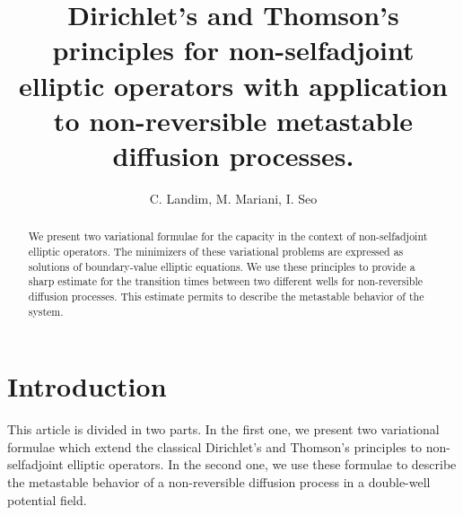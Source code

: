 \documentclass[reqno]{amsart}
\newcounter{as}[section]
\newcommand{\<}{\langle}
\renewcommand{\>}{\rangle}
\begin{document}
\title[Metastability in non-reversible diffusion processes] {
  Dirichlet's and Thomson's principles for non-selfadjoint elliptic
  operators with application to non-reversible metastable diffusion
  processes.}

\begin{abstract}
  We present two variational formulae for the capacity in the context
  of non-selfadjoint elliptic operators. The minimizers of these
  variational problems are expressed as solutions of boundary-value
  elliptic equations.  We use these principles to provide a sharp
  estimate for the transition times between two different wells for
  non-reversible diffusion processes.  This estimate permits to
  describe the metastable behavior of the system.
\end{abstract}

\author{C. Landim, M. Mariani, I. Seo}

\address{\noindent IMPA, Estrada Dona Castorina 110, CEP 22460 Rio de
  Janeiro, Brasil and CNRS UMR 6085, Universit\'e de Rouen, France.
  \newline e-mail: \rm \texttt{landim@impa.br} }

\address{\noindent Faculty of Mathematics, National Research University Higher School of Economics, 6 Usacheva St., 119048 Moscow, Russia. \newline e-mail: \rm
  \texttt{mmariani@hse.ru}}

\address{\noindent Department of Mathematical Sciences, Seoul National University Gwanak-Ro 1, Gwanak-Gu 08826, Seoul, Republic of Korea. \newline
  e-mail: \rm \texttt{insuk.seo@snu.ac.kr} }


\maketitle

\section{Introduction}
\label{sec-1}

This article is divided in two parts. In the first one, we present two
variational formulae which extend the classical Dirichlet's and
Thomson's principles to non-selfadjoint elliptic operators. In the
second one, we use these formulae to describe the metastable behavior
of a non-reversible diffusion process in a double-well potential
field.
\end{document}

